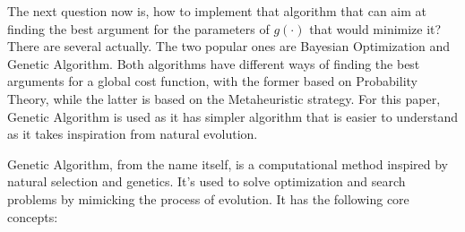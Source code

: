 The next question now is, how to implement that algorithm that can aim at finding the best argument for the parameters of $g(\cdot)$ that would minimize it? There are several actually. The two popular ones are Bayesian Optimization and Genetic Algorithm. Both algorithms have different ways of finding the best arguments for a global cost function, with the former based on Probability Theory, while the latter is based on the Metaheuristic strategy. For this paper, Genetic Algorithm is used as it has simpler algorithm that is easier to understand as it takes inspiration from natural evolution.

Genetic Algorithm, from the name itself, is a computational method inspired by natural selection and genetics. It's used to solve optimization and search problems by mimicking the process of evolution. It has the following core concepts: 

